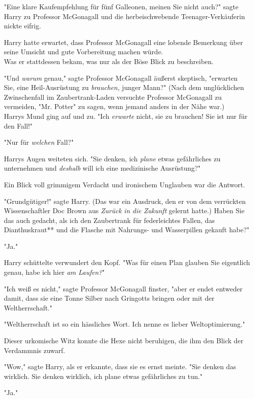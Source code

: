 {"Eine klare Kaufempfehlung für fünf Galleonen, meinen Sie nicht auch?" sagte Harry zu Professor McGonagall und die herbeischwebende Teenager-Verkäuferin nickte eifrig.

Harry hatte erwartet, dass Professor McGonagall eine lobende Bemerkung über seine Umsicht und gute Vorbereitung machen würde.\\ Was er stattdessen bekam, was nur als der Böse Blick zu beschreiben.

"Und \emph{warum} genau," sagte Professor McGonagall äußerst skeptisch, "erwarten Sie, eine Heil-Ausrüstung zu \emph{brauchen,} junger Mann?" (Nach dem unglücklichen Zwinschenfall im Zaubertrank-Laden versuchte Professor McGonagall zu vermeiden, "Mr. Potter" zu sagen, wenn jemand anders in der Nähe war.)\\ Harrys Mund ging auf und zu. "Ich \emph{erwarte} nicht, sie zu brauchen! Sie ist nur für den Fall!"

"Nur für \emph{welchen} Fall?"

Harrys Augen weiteten sich. "Sie denken, ich \emph{plane} etwas gefährliches zu unternehmen und \emph{deshalb} will ich eine medizinische Ausrüstung?"

Ein Blick voll grimmigem Verdacht und ironischem Unglauben war die Antwort.

"Grundgütiger!" sagte Harry. (Das war ein Ausdruck, den er von dem verrückten Wissenschaftler Doc Brown aus \emph{Zurück in die Zukunft} gelernt hatte.) Haben Sie das auch gedacht, als ich den Zaubertrank für federleichtes Fallen, das Dianthuskraut** und die Flasche mit Nahrungs- und Wasserpillen gekauft habe?"

"Ja."

Harry schüttelte verwundert den Kopf. "Was für einen Plan glauben Sie eigentlich genau, habe ich hier \emph{am Laufen?}"

"Ich weiß es nicht," sagte Professor McGonagall finster, "aber er endet entweder damit, dass sie eine Tonne Silber nach Gringotts bringen oder mit der Weltherrschaft."

"Weltherrschaft ist so ein hässliches Wort. Ich nenne es lieber Weltoptimierung."

Dieser urkomische Witz konnte die Hexe nicht beruhigen, die ihm den Blick der Verdammnis zuwarf.

"Wow," sagte Harry, als er erkannte, dass sie es ernst meinte. "Sie denken das wirklich. Sie denken wirklich, ich plane etwas gefährliches zu tun."

"Ja."

}
